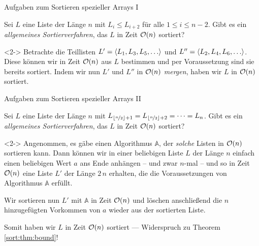 \begin{frame}{Aufgaben zum Sortieren spezieller Arrays I}
\begin{task}
Sei $L$ eine Liste der L\"ange $n$ mit $L_i \leq L_{i + 2}$ f\"ur alle $1 \leq i \leq n - 2$.
Gibt es ein \emph{allgemeines Sortierverfahren}, das $L$ in Zeit $\mathcal{O}(n)$ sortiert?
\end{task}

\begin{solution}<2->
Betrachte die Teillisten $L' = \alglist{L_1, L_3, L_5, \dots}$ und $L'' = \alglist{L_2, L_4, L_6, \dots}$.
Diese k\"onnen wir in Zeit $\mathcal{O}(n)$ aus $L$ bestimmen und per Voraussetzung sind sie bereits sortiert.
Indem wir nun $L'$ und $L''$ in $\mathcal{O}(n)$ \emph{mergen}, haben wir $L$ in $\mathcal{O}(n)$ sortiert.
\end{solution}
\end{frame}

\begin{frame}{Aufgaben zum Sortieren spezieller Arrays II}
\begin{task}
Sei $L$ eine Liste der L\"ange $n$ mit $L_{\lfloor\nicefrac{n}{2}\rfloor + 1} = L_{\lfloor\nicefrac{n}{2}\rfloor + 2} = \dots = L_n$.
Gibt es ein \emph{allgemeines Sortierverfahren}, das $L$ in Zeit $\mathcal{O}(n)$ sortiert?
\end{task}

\begin{solution}<2->
Angenommen, es g\"abe einen Algorithmus $\mathbb{A}$, der \emph{solche} Listen in $\mathcal{O}(n)$ sortieren kann.
Dann k\"onnen wir in einer \alert{beliebigen} Liste $L$ der L\"ange $n$ einfach einen beliebigen Wert $a$ ans Ende anh\"angen -- und zwar $n$-mal -- und so in Zeit $\mathcal{O}(n)$ eine Liste $L'$ der L\"ange $2 \, n$ erhalten, die die Voraussetzungen von Algorithmus $\mathbb{A}$ erf\"ullt.

Wir sortieren nun $L'$ mit $\mathbb{A}$ in Zeit $\mathcal{O}(n)$ und l\"oschen anschlie{\ss}end die $n$ hinzugef\"ugten Vorkommen von $a$ wieder aus der sortierten Liste.

Somit haben wir $L$ in Zeit $\mathcal{O}(n)$ sortiert --- Widerspruch zu Theorem \ref{sort:thm:bound}!
\end{solution}
\end{frame}


